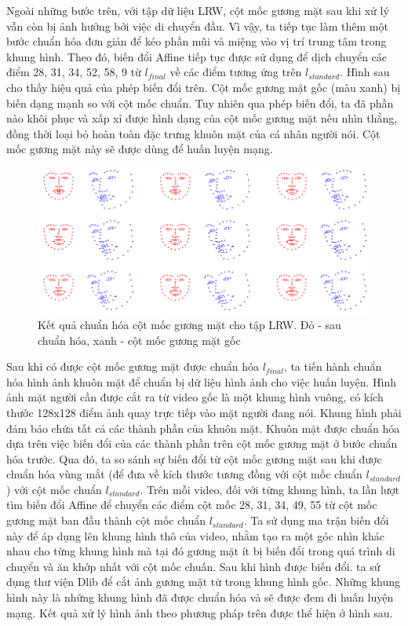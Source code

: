 Ngoài những bước trên, với tập dữ liệu LRW, cột mốc gương mặt sau khi xử lý vẫn còn bị ảnh hưởng bởi việc di chuyển đầu. Vì vậy, ta tiếp tục làm thêm một bước chuẩn hóa đơn giản để kéo phần mũi và miệng vào vị trí trung tâm trong khung hình. Theo đó, biến đổi Affine tiếp tục được sử dụng để dịch chuyển các điểm 28, 31, 34, 52, 58, 9 từ $l_{final}$ về các điểm tương ứng trên $l_{standard}$. Hình sau cho thấy hiệu quả của phép biến đổi trên. Cột mốc gương mặt gốc (màu xanh) bị biến dạng mạnh so với cột mốc chuẩn. Tuy nhiên qua phép biến đổi, ta đã phần nào khôi phục và xấp xỉ được hình dạng của cột mốc gương mặt nếu nhìn thằng, đồng thời loại bỏ hoàn toàn đặc trưng khuôn mặt của cá nhân người nói. Cột mốc gương mặt này sẽ được dùng để huấn luyện mạng.

\begin{figure}[H]
    \centering
    \includegraphics[width=15cm]{./content/materials/standardize_landmark.png}
    \caption{Kết quả chuẩn hóa cột mốc gương mặt cho tập LRW. Đỏ - sau chuẩn hóa, xanh - cột mốc gương mặt gốc}
\end{figure}

Sau khi có được cột mốc gương mặt được chuẩn hóa $l_{final}$, ta tiến hành chuẩn hóa hình ảnh khuôn mặt để chuẩn bị dữ liệu hình ảnh cho việc huấn luyện. Hình ảnh mặt người cần được cắt ra từ video gốc là một khung hình vuông, có kích thước 128x128 điểm ảnh quay trực tiếp vào mặt người đang nói. Khung hình phải đảm bảo chứa tất cả các thành phần của khuôn mặt. Khuôn mặt được chuẩn hóa dựa trên việc biến đổi của các thành phần trên cột mốc gương mặt ở bước chuẩn hóa trước. Qua đó, ta so sánh sự biến đổi từ cột mốc gương mặt sau khi được chuẩn hóa vùng mắt (để đưa về kích thước tương đồng với cột mốc chuẩn $l_{standard}$) với cột mốc chuẩn $l_{standard}$. Trên mỗi video, đối với từng khung hình, ta lần lượt tìm biến đổi Affine để chuyển các điểm cột mốc 28, 31, 34, 49, 55 từ cột mốc gương mặt ban đầu thành cột mốc chuẩn $l_{standard}$. Ta sử dụng ma trận biến đổi này để áp dụng lên khung hình thô của video, nhằm tạo ra một góc nhìn khác nhau cho từng khung hình mà tại đó gương mặt ít bị biến đổi trong quá trình di chuyển và ăn khớp nhất với cột mốc chuấn. Sau khi hình được biến đổi. ta sử dụng thư viện Dlib để cắt ảnh gương mặt từ trong khung hình gốc. Những khung hình này là những khung hình đã được chuẩn hóa và sẽ được đem đi huấn luyện mạng. Kết quả xử lý hình ảnh theo phương pháp trên được thể hiện ở hình sau.

